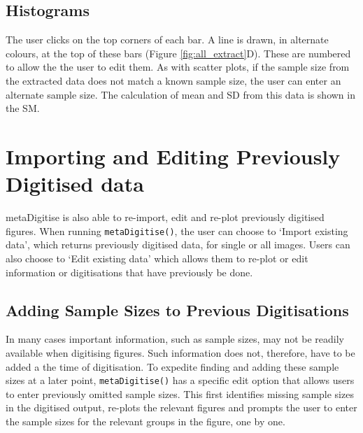 \documentclass[12pt]{article}
\newcommand{\fct}[1]{\texttt{#1()}}
\newcommand{\pkg}[1]{{\fontseries{b}\selectfont #1}}
\begin{document}
\subsection{Histograms}
The user clicks on the top corners of each bar. A line is drawn, in alternate colours, at the top of these bars (Figure \ref{fig:all_extract}D). These are numbered to allow the the user to edit them. As with scatter plots, if the sample size from the extracted data does not match a known sample size, the user can enter an alternate sample size. The calculation of mean and SD from this data is shown in the SM.






\section{Importing and Editing Previously Digitised data}
\pkg{metaDigitise} is also able to re-import, edit and re-plot previously digitised figures. When running \fct{metaDigitise}, the user can choose to `Import existing data', which returns previously digitised data, for single or all images. Users can also choose to `Edit existing data' which allows them to re-plot or edit information or digitisations that have previously be done.


\subsection{Adding Sample Sizes to Previous Digitisations}
In many cases important information, such as sample sizes, may not be readily available when digitising figures. Such information does not, therefore, have to be added a the time of digitisation. To expedite finding and adding these sample sizes at a later point, \fct{metaDigitise} has a specific edit option that allows users to enter previously omitted sample sizes. This first identifies missing sample sizes in the digitised output, re-plots the relevant figures and prompts the user to enter the sample sizes for the relevant groups in the figure, one by one. 




\end{document}
